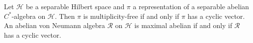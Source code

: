 Let $\mathcal{H}$ be a separable Hilbert space and $\pi$ a representation of a separable abelian $C^*$-algebra on $\mathcal{H}$. Then $\pi$ is multiplicity-free if and only if $\pi$ has a cyclic vector. An abelian von Neumann algebra $\mathcal{R}$ on $\mathcal{H}$ is maximal abelian if and only if $\mathcal{R}$ has a cyclic vector.
